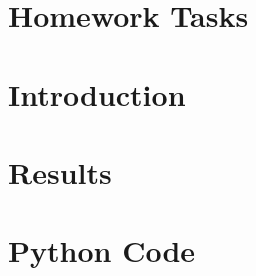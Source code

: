 \documentclass[10pt, a4paper]{article}
\begin{document}


\section*{Homework Tasks}

\pagebreak

\section{Introduction}


\section{Results}


%

\pagebreak

\printbibheading

\begin{refsection}
\nocite{*}
\printbibliography[heading=subbibliography,title={Software Used}]
\end{refsection}

\begin{refsection}
\nocite{*}
\printbibliography[heading=subbibliography,title={Web}]
\end{refsection}

\pagebreak
\appendix
\section{Python Code}\label{app:script}
\inputminted{python}{./code/code.py}
\end{document}

